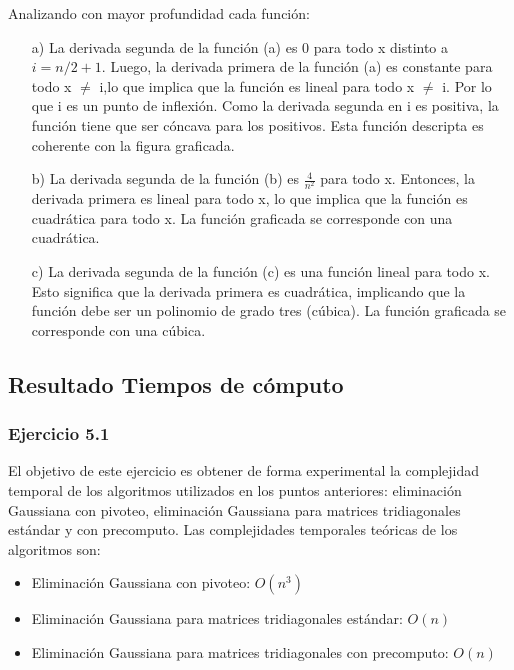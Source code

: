     Analizando con mayor profundidad cada función:\par
    \begin{enumerate}
        \item[a)] La derivada segunda de la función (a) es 0 para todo x distinto a $i = n/2 + 1$. Luego, la derivada primera de la función (a) es constante para todo x $\not =$ i,lo que implica que la función es lineal para todo x $\not =$ i. Por lo que i es un punto de inflexión. Como la derivada segunda en i es positiva, la función tiene que ser cóncava para los positivos. Esta función descripta es coherente con la figura graficada.

        \item[b)] La derivada segunda de la función (b) es $\frac{4}{n^2}$ para todo x. Entonces, la derivada primera es lineal para todo x, lo que implica que la función es cuadrática para todo x. La función graficada se corresponde con una cuadrática.

      \item[c)] La derivada segunda de la función (c) es una función lineal para todo x. Esto significa que la derivada primera es cuadrática, implicando que la función debe ser un polinomio de grado tres (cúbica). La función graficada se corresponde con una cúbica.
    \end{enumerate}
\fi    
    
    
    

\iffalse
    \subsection{Resultado Tiempos de cómputo}
    \label{resultados tiempo}
    \subsubsection{Ejercicio 5.1}
    El objetivo de este ejercicio es obtener de forma experimental la complejidad temporal de los algoritmos utilizados en los puntos anteriores: eliminación Gaussiana con pivoteo, eliminación Gaussiana para matrices tridiagonales estándar y con precomputo. Las complejidades temporales teóricas de los algoritmos son:

    \begin{itemize}
        \item Eliminación Gaussiana con pivoteo: $O(n^{3})$
        \item Eliminación Gaussiana para matrices tridiagonales estándar: $O(n)$
        \item Eliminación Gaussiana para matrices tridiagonales con precomputo: $O(n)$
    \end{itemize}

